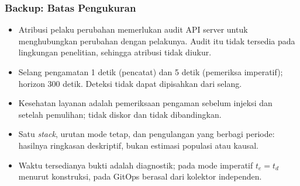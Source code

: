 {
\usebackgroundtemplate{\backgroundcontent}
\begin{frame}
    \frametitle{Backup: Batas Pengukuran}
    \small
    \begin{itemize}\setlength{\itemsep}{5pt}
        \item Atribusi pelaku perubahan memerlukan audit API server untuk menghubungkan perubahan dengan pelakunya. Audit itu tidak tersedia pada lingkungan penelitian, sehingga atribusi tidak diukur.
        \item Selang pengamatan 1 detik (pencatat) dan 5 detik (pemeriksa imperatif); horizon 300 detik. Deteksi tidak dapat dipisahkan dari selang.
        \item Kesehatan layanan adalah pemeriksaan pengaman sebelum injeksi dan setelah pemulihan; tidak diskor dan tidak dibandingkan.
        \item Satu \textit{stack}, urutan mode tetap, dan pengulangan yang berbagi periode: hasilnya ringkasan deskriptif, bukan estimasi populasi atau kausal.
        \item Waktu tersedianya bukti adalah diagnostik; pada mode imperatif $t_e=t_d$ menurut konstruksi, pada GitOps berasal dari kolektor independen.
    \end{itemize}
    \vspace{0.10cm}
\end{frame}
}

